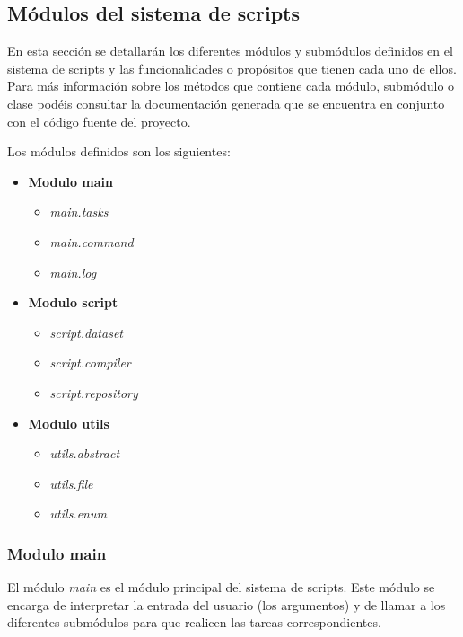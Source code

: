 \subsection{Módulos del sistema de scripts}
\label{subsec:modulos_sistema_scripts}

En esta sección se detallarán los diferentes módulos y submódulos definidos en el sistema de scripts y las
funcionalidades o propósitos que tienen cada uno de ellos. Para más información sobre los métodos que contiene
cada módulo, submódulo o clase podéis consultar la documentación generada que se encuentra en conjunto con
el código fuente del proyecto.

Los módulos definidos son los siguientes:

\begin{itemize}
    \item \textbf{Modulo main}
    \begin{itemize}
        \item \textit{main.tasks}
        \item \textit{main.command}
        \item \textit{main.log}
    \end{itemize}
    \item \textbf{Modulo script}
    \begin{itemize}
        \item \textit{script.dataset}
        \item \textit{script.compiler}
        \item \textit{script.repository}
    \end{itemize}
    \item \textbf{Modulo utils}
    \begin{itemize}
        \item \textit{utils.abstract}
        \item \textit{utils.file}
        \item \textit{utils.enum}
    \end{itemize}
\end{itemize}

\subsubsection{Modulo main}
\label{subsubsec:modulo_main}

El módulo \textit{main} es el módulo principal del sistema de scripts. Este módulo se encarga de interpretar
la entrada del usuario (los argumentos) y de llamar a los diferentes submódulos para que realicen las tareas
correspondientes.

